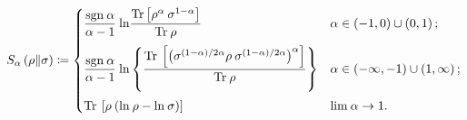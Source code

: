 \documentclass[preprints,article,accept,moreauthors,pdftex]{Definitions/mdpi}
\begin{document}
\begin{equation}
    \label{eq:alpha-RRE}
    S_{\alpha}\left(\rho\Vert\sigma\right) \coloneqq
    \begin{dcases}
        \frac{\mathrm{sgn}\:\alpha}{\alpha - 1}\:\mathrm{ln}\frac{\mathrm{Tr} \left[\rho^{\alpha}\:\sigma^{1-\alpha}\right]}{\mathrm{Tr}\:\rho} & \alpha \in \left(-1,0\right)\cup\left(0, 1\right); \\[2pt]
        \frac{\mathrm{sgn}\:\alpha}{\alpha - 1}\:\mathrm{ln} \left\{\frac{\mathrm{Tr}\:\left[\left(\sigma^{\left(1-\alpha\right)/2\alpha} \rho\: \sigma^{\left(1-\alpha\right)/2\alpha}\right)^{\alpha}\right]}{\mathrm{Tr}\:\rho}\right\} & \alpha \in \left(-\infty,-1\right)\cup\left(1,\infty\right); \\[2pt]
        \mathrm{Tr}\:\left[\rho\:\!\left(\mathrm{ln}\:\rho - \mathrm{ln}\:\sigma\right)\right] & \mathrm{lim}\:\alpha \rightarrow 1.
    \end{dcases}
\end{equation}
\end{document}
